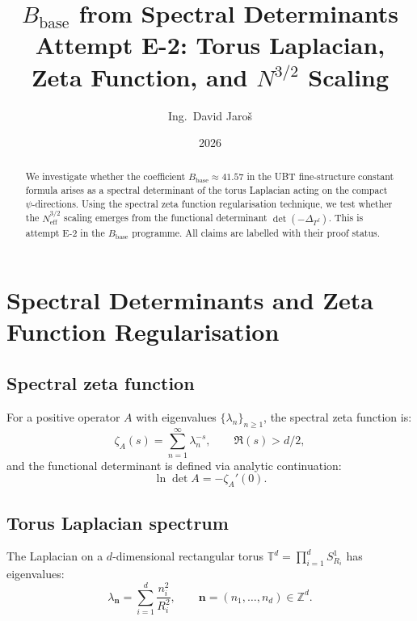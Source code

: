 \documentclass[11pt,a4paper]{article}
\title{$B_{\mathrm{base}}$ from Spectral Determinants\\
\large Attempt E-2: Torus Laplacian, Zeta Function, and $N^{3/2}$ Scaling}
\author{Ing.\ David Jaroš}
\date{2026}
\begin{document}
\maketitle

\begin{abstract}
We investigate whether the coefficient $B_{\mathrm{base}} \approx 41.57$
in the UBT fine-structure constant formula arises as a spectral determinant
of the torus Laplacian acting on the compact $\psi$-directions.  Using the
spectral zeta function regularisation technique, we test whether the
$N_{\mathrm{eff}}^{3/2}$ scaling emerges from the functional determinant
$\det(-\Delta_{T^d})$.  This is attempt E-2 in the $B_{\mathrm{base}}$
programme.  All claims are labelled with their proof status.
\end{abstract}

\tableofcontents

\section{Spectral Determinants and Zeta Function Regularisation}
\label{sec:zeta}

\subsection{Spectral zeta function}

For a positive operator $A$ with eigenvalues $\{\lambda_n\}_{n \geq 1}$, the
spectral zeta function is:
\begin{equation}
\label{eq:spec_zeta}
  \zeta_A(s) = \sum_{n=1}^\infty \lambda_n^{-s}, \qquad \Re(s) > d/2,
\end{equation}
and the functional determinant is defined via analytic continuation:
\begin{equation}
\label{eq:log_det}
  \ln\det A = -\zeta_A'(0).
\end{equation}

\subsection{Torus Laplacian spectrum}

The Laplacian on a $d$-dimensional rectangular torus
$\mathbb{T}^d = \prod_{i=1}^d S^1_{R_i}$ has eigenvalues:
\begin{equation}
\label{eq:torus_spec}
  \lambda_{\mathbf{n}} = \sum_{i=1}^d \frac{n_i^2}{R_i^2},
  \qquad \mathbf{n} = (n_1,\ldots,n_d) \in \mathbb{Z}^d.
\end{equation}
\end{document}
